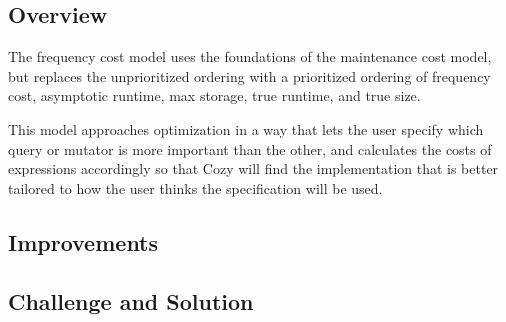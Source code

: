 \newcommand{\code}[1]{\texttt{#1}}

\subsection{Overview}
The frequency cost model uses the foundations of the maintenance cost model, but
replaces the unprioritized ordering with a prioritized ordering of frequency
cost, asymptotic runtime, max storage, true runtime, and true size. 

This model approaches optimization in a way that lets the user specify which
query or mutator is more important than the other, and calculates the costs of
expressions accordingly so that Cozy will find the implementation that is better
tailored to how the user thinks the specification will be used.

\subsection{Improvements}

\subsection{Challenge and Solution}
